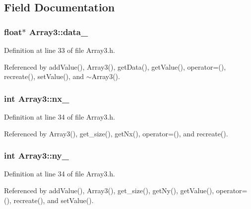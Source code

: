 \subsection{Field Documentation}
\subsubsection[{data\_\-}]{\setlength{\rightskip}{0pt plus 5cm}float$\ast$ {\bf Array3::data\_\-}}\label{classArray3_af704629bb93bda9e842fa627c81d98b2}


Definition at line 33 of file Array3.h.



Referenced by addValue(), Array3(), getData(), getValue(), operator=(), recreate(), setValue(), and $\sim$Array3().

\subsubsection[{nx\_\-}]{\setlength{\rightskip}{0pt plus 5cm}int {\bf Array3::nx\_\-}}\label{classArray3_add3e47ecef09b38350ea9b45928d068c}


Definition at line 34 of file Array3.h.



Referenced by Array3(), get\_\-size(), getNx(), operator=(), and recreate().

\subsubsection[{ny\_\-}]{\setlength{\rightskip}{0pt plus 5cm}int {\bf Array3::ny\_\-}}\label{classArray3_a5dad0675c57a85ab9f0a5cdc514b04cb}


Definition at line 34 of file Array3.h.



Referenced by addValue(), Array3(), get\_\-size(), getNy(), getValue(), operator=(), recreate(), and setValue().

